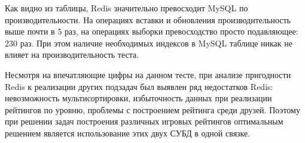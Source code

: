 \documentclass[10pt, a5paper]{article}
\begin{document}
Как видно из таблицы, Redis значительно превосходит MySQL по производительности. На операциях вставки и обновления производительность выше почти в 5 раз, на операциях выборки превосходство просто подавляющее: 230 раз. При этом наличие необходимых индексов в MySQL таблице никак не влияет на производительность теста.

Несмотря на впечатляющие цифры на данном тесте, при анализе пригодности Redis к реализации других подзадач был выявлен ряд недостатков Redis: невозможность мультисортировки, избыточность данных при реализации рейтингов по уровню, проблемы с построением рейтинга среди друзей. Поэтому при решении задач построения различных игровых рейтингов оптимальным решением является использование этих двух СУБД в одной связке.
\end{document}
